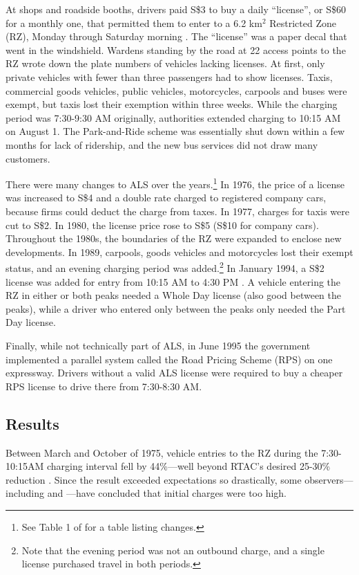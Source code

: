 At shops and roadside booths, drivers paid S\$3 to buy a daily ``license'', or S\$60 for a monthly one, that permitted them to enter to a 6.2 km$^{2}$ Restricted Zone (RZ), Monday through Saturday morning \citep{WatsonHolland1978}. The ``license'' was a paper decal that went in the windshield. Wardens standing by the road at 22 access points to the RZ wrote down the plate numbers of vehicles lacking licenses. At first, only private vehicles with fewer than three passengers had to show licenses. Taxis, commercial goods vehicles, public vehicles, motorcycles, carpools and buses were exempt, but taxis lost their exemption within three weeks. While the charging period was 7:30-9:30 AM originally, authorities  extended charging to 10:15 AM on August 1. The Park-and-Ride scheme was essentially shut down within a few months for lack of ridership, and the new bus services did not draw many customers. 

There were many changes to ALS over the years.\footnote{See Table 1 of \citet[p. 98]{PhangToh1997} for a table listing changes. } In 1976, the price of a license was increased to S\$4 and a double rate charged to registered company cars, because firms could deduct the charge from taxes. In 1977, charges for taxis were cut to S\$2. In 1980, the license price rose to S\$5 (S\$10 for company cars). Throughout the 1980s, the boundaries of the RZ were expanded to enclose new developments. In 1989, carpools, goods vehicles and motorcycles lost their exempt status, and an evening charging period was added.\footnote{Note that the evening period was not an outbound charge, and a single license purchased travel in both periods.} In January 1994, a S\$2 license was added for entry from 10:15 AM to 4:30 PM \citep{PhangToh2004}. A vehicle entering the RZ in either or both peaks needed a Whole Day license (also good between the peaks), while a driver who entered only between the peaks only needed the Part Day license. 

Finally, while not technically part of ALS, in June 1995 the government implemented a parallel system called the Road Pricing Scheme (RPS) on one expressway. Drivers without a valid ALS license were required to buy a cheaper RPS license to drive there from 7:30-8:30 AM.

\subsection{Results}

Between March and October of 1975, vehicle entries to the RZ during the 7:30-10:15AM charging interval fell by 44\%---well beyond RTAC's desired 25-30\% reduction \citep{WatsonHolland1978}. Since the result exceeded expectations so drastically, some observers---including \citet{Wilson1988a,McCarthyTay1993} and \citet{WatsonHolland1978}---have concluded that initial charges were too high.

